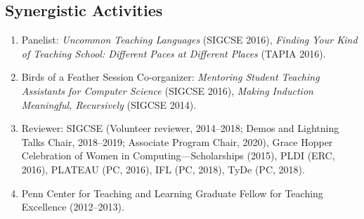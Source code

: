 \documentclass[11pt]{article}
\begin{document}
\subsection*{Synergistic Activities}
\begin{enumerate}
  \item Panelist: \emph{Uncommon Teaching Languages} (SIGCSE 2016), \emph{Finding Your Kind of Teaching School: Different Paces at Different Places} (TAPIA 2016).
  \item Birds of a Feather Session Co-organizer: \emph{Mentoring Student Teaching Assistants for Computer Science} (SIGCSE 2016), \emph{Making Induction Meaningful, Recursively} (SIGCSE 2014).
  \item Reviewer: SIGCSE (Volunteer reviewer, 2014--2018; Demos and Lightning Talks Chair, 2018--2019; Associate Program Chair, 2020), Grace Hopper Celebration of Women in
    Computing---Scholarships (2015), PLDI (ERC, 2016), PLATEAU (PC, 2016), IFL (PC, 2018), TyDe (PC, 2018).
  \item Penn Center for Teaching and Learning Graduate Fellow for Teaching
    Excellence (2012--2013).
\end{enumerate}
\end{document}
